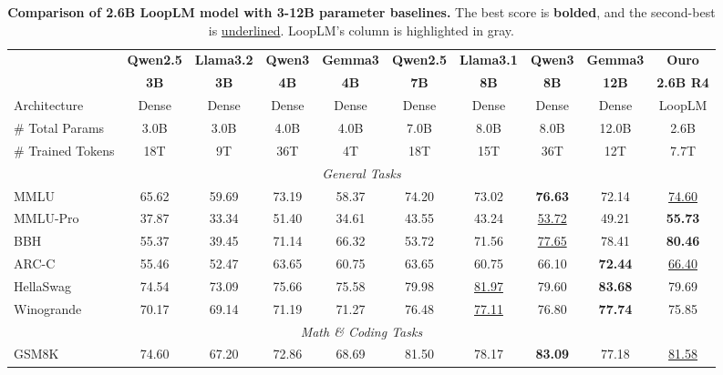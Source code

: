 \documentclass[]{bytedance_seed}
\newcommand{\1}{\mathbf{1}}
\newcommand{\ut}{LoopLM}
\begin{document}
\begin{table}[htbp]
\centering
\caption{\textbf{Comparison of 2.6B \ut{} model with 3-12B parameter baselines.} The best score is \textbf{bolded}, and the second-best is \underline{underlined}. \ut{}'s column is highlighted in gray.}
\label{tab:base-2.6B}
\small
\setlength{\tabcolsep}{2.5pt}
\begin{tabular}{@{}lccccccccc@{}}
\toprule
 & \textbf{Qwen2.5} & \textbf{Llama3.2} & \textbf{Qwen3} & \textbf{Gemma3} & \textbf{Qwen2.5} & \textbf{Llama3.1} & \textbf{Qwen3} & \textbf{Gemma3} & \cellcolor{lightergray}\textbf{Ouro} \\
 & \textbf{3B} & \textbf{3B} & \textbf{4B} & \textbf{4B} & \textbf{7B} & \textbf{8B} & \textbf{8B} & \textbf{12B} & \cellcolor{lightergray}\textbf{2.6B R4} \\
\midrule
Architecture & Dense & Dense & Dense & Dense & Dense & Dense & Dense & Dense & \cellcolor{lightergray}\ut{}\\
\# Total Params & 3.0B & 3.0B & 4.0B & 4.0B & 7.0B & 8.0B & 8.0B & 12.0B & \cellcolor{lightergray}2.6B\\
\# Trained Tokens & 18T & 9T & 36T & 4T & 18T & 15T & 36T & 12T & \cellcolor{lightergray}7.7T\\
\midrule
\multicolumn{10}{c}{\textit{General Tasks}} \\
\midrule
MMLU & 65.62 & 59.69 & 73.19 & 58.37 & 74.20 & 73.02 & \textbf{76.63} & 72.14 & \cellcolor{lightergray}\underline{74.60} \\
MMLU-Pro & 37.87 & 33.34 & 51.40 & 34.61 & 43.55 & 43.24 & \underline{53.72} & 49.21 & \cellcolor{lightergray}\textbf{55.73} \\
BBH & 55.37 & 39.45 & 71.14 & 66.32 & 53.72 & 71.56 & \underline{77.65} & 78.41 & \cellcolor{lightergray}\textbf{80.46} \\
ARC-C & 55.46 & 52.47 & 63.65 & 60.75 & 63.65 & 60.75 & 66.10 & \textbf{72.44} & \cellcolor{lightergray}\underline{66.40} \\
HellaSwag & 74.54 & 73.09 & 75.66 & 75.58 & 79.98 & \underline{81.97} & 79.60 & \textbf{83.68} & \cellcolor{lightergray}79.69 \\
Winogrande & 70.17 & 69.14 & 71.19 & 71.27 & 76.48 & \underline{77.11} & 76.80 & \textbf{77.74} & \cellcolor{lightergray}75.85 \\
\midrule
\multicolumn{10}{c}{\textit{Math \& Coding Tasks}} \\
\midrule
GSM8K & 74.60 & 67.20 & 72.86 & 68.69 & 81.50 & 78.17 & \textbf{83.09} & 77.18 & \cellcolor{lightergray}\underline{81.58} \\

\end{tabular}
\end{table}
\end{document}
